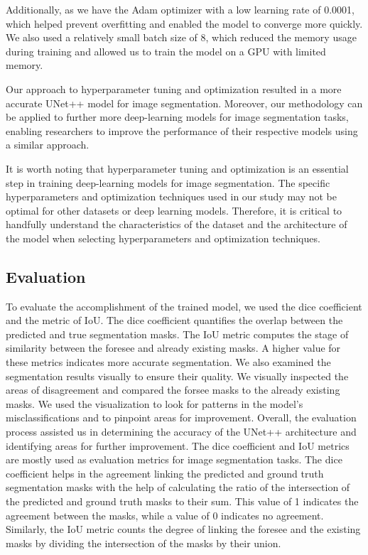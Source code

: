 \documentclass[conference]{IEEEtran}
\begin{document}
Additionally, as we have the Adam optimizer with a low learning rate of 0.0001, which helped prevent overfitting and enabled the model to converge more quickly. We also used a relatively small batch size of 8, which reduced the memory usage during training and allowed us to train the model on a GPU with limited memory.

Our approach to hyperparameter tuning and optimization resulted in a more accurate UNet++ model for image segmentation. Moreover, our methodology can be applied to further more deep-learning models for image segmentation tasks, enabling researchers to improve the performance of their respective  models using a similar approach.

It is worth noting that hyperparameter tuning and optimization is an essential step in training deep-learning models for image segmentation. The specific hyperparameters and optimization techniques used in our study may not be optimal for other datasets or deep learning models. Therefore, it is critical to handfully understand the characteristics of the dataset and the architecture of the model when selecting hyperparameters and optimization techniques.
\subsection{Evaluation}\label{SCM}
To evaluate the accomplishment of the trained model, we used the dice coefficient and the metric of IoU. The dice coefficient quantifies the overlap between the predicted and true segmentation masks. The IoU metric computes the stage of similarity between the foresee and already existing masks. A higher value for these metrics indicates more accurate segmentation.
We also examined the segmentation results visually to ensure their quality. We visually inspected the areas of disagreement and compared the forsee masks to the already existing masks. We used the visualization to look for patterns in the model's misclassifications and to pinpoint areas for improvement. Overall, the evaluation process assisted us in determining the accuracy of the UNet++ architecture and identifying areas for further improvement.
The dice coefficient and IoU metrics are mostly used as evaluation metrics for image segmentation tasks. The dice coefficient helps in the agreement linking the predicted and ground truth segmentation masks with the help of  calculating the ratio of the intersection of the predicted and ground truth masks to their sum. This value of 1 indicates the agreement between the masks, while a value of 0 indicates no agreement. Similarly, the IoU metric counts the degree of linking the foresee and the existing masks by dividing the intersection of the masks by their union.
\end{document}
